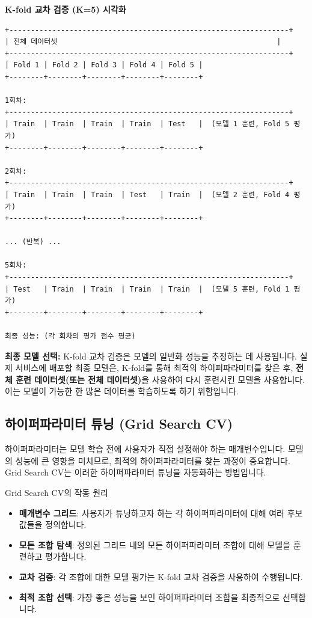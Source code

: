\documentclass[11pt,a4paper]{article}
\begin{document}
\begin{center}
\textbf{K-fold 교차 검증 (K=5) 시각화}
\begin{verbatim}
+-----------------------------------------------------------------+
| 전체 데이터셋                                                   |
+-----------------------------------------------------------------+
| Fold 1 | Fold 2 | Fold 3 | Fold 4 | Fold 5 |
+--------+--------+--------+--------+--------+

1회차:
+-----------------------------------------------------------------+
| Train  | Train  | Train  | Train  | Test   |  (모델 1 훈련, Fold 5 평가)
+--------+--------+--------+--------+--------+

2회차:
+-----------------------------------------------------------------+
| Train  | Train  | Train  | Test   | Train  |  (모델 2 훈련, Fold 4 평가)
+--------+--------+--------+--------+--------+

... (반복) ...

5회차:
+-----------------------------------------------------------------+
| Test   | Train  | Train  | Train  | Train  |  (모델 5 훈련, Fold 1 평가)
+--------+--------+--------+--------+--------+

최종 성능: (각 회차의 평가 점수 평균)
\end{verbatim}
\end{center}

\textbf{최종 모델 선택:}
K-fold 교차 검증은 모델의 일반화 성능을 추정하는 데 사용됩니다. 실제 서비스에 배포할 최종 모델은, K-fold를 통해 최적의 하이퍼파라미터를 찾은 후, \textbf{전체 훈련 데이터셋(또는 전체 데이터셋)}을 사용하여 다시 훈련시킨 모델을 사용합니다. 이는 모델이 가능한 한 많은 데이터를 학습하도록 하기 위함입니다.

\subsection{하이퍼파라미터 튜닝 (Grid Search CV)}

하이퍼파라미터는 모델 학습 전에 사용자가 직접 설정해야 하는 매개변수입니다. 모델의 성능에 큰 영향을 미치므로, 최적의 하이퍼파라미터를 찾는 과정이 중요합니다. Grid Search CV는 이러한 하이퍼파라미터 튜닝을 자동화하는 방법입니다.

\begin{infobox}{Grid Search CV의 작동 원리}
\begin{itemize}
    \item \textbf{매개변수 그리드}: 사용자가 튜닝하고자 하는 각 하이퍼파라미터에 대해 여러 후보 값들을 정의합니다.
    \item \textbf{모든 조합 탐색}: 정의된 그리드 내의 모든 하이퍼파라미터 조합에 대해 모델을 훈련하고 평가합니다.
    \item \textbf{교차 검증}: 각 조합에 대한 모델 평가는 K-fold 교차 검증을 사용하여 수행됩니다.
    \item \textbf{최적 조합 선택}: 가장 좋은 성능을 보인 하이퍼파라미터 조합을 최종적으로 선택합니다.
\end{itemize}
\end{infobox}
\end{document}
